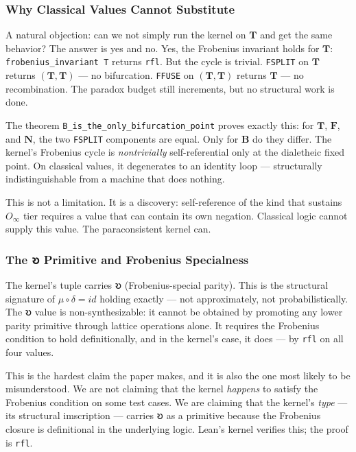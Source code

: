 \documentclass[10pt,a4paper]{article}
\begin{document}
\subsubsection{Why Classical Values Cannot Substitute}

A natural objection: can we not simply run the kernel on $\mathbf{T}$ and get the same behavior? The answer is yes and no. Yes, the Frobenius invariant holds for $\mathbf{T}$: \texttt{frobenius\_\allowbreak invariant T} returns \texttt{rfl}. But the cycle is trivial. \texttt{FSPLIT}  on $\mathbf{T}$ returns $(\mathbf{T}, \mathbf{T})$ --- no bifurcation. \texttt{FFUSE} on $(\mathbf{T}, \mathbf{T})$ returns $\mathbf{T}$ --- no recombination. The paradox budget still increments, but no structural work is done.

The theorem \texttt{B\_\allowbreak is\_\allowbreak the\_\allowbreak only\_\allowbreak bifurcation\_\allowbreak point} proves exactly this: for $\mathbf{T}$, $\mathbf{F}$, and $\mathbf{N}$, the two \texttt{FSPLIT}  components are equal. Only for $\mathbf{B}$ do they differ. The kernel's Frobenius cycle is \emph{nontrivially} self-referential only at the dialetheic fixed point. On classical values, it degenerates to an identity loop --- structurally indistinguishable from a machine that does nothing.

This is not a limitation. It is a discovery: self-reference of the kind that sustains $O_{\infty}$ tier requires a value that can contain its own negation. Classical logic cannot supply this value. The paraconsistent kernel can.

\subsubsection{The 𐑹 Primitive and Frobenius Specialness}

The kernel's tuple carries 𐑹 (Frobenius-special parity). This is the structural signature of $\mu\circ\delta = id$ holding exactly --- not approximately, not probabilistically. The 𐑹 value is non-synthesizable: it cannot be obtained by promoting any lower parity primitive through lattice operations alone. It requires the Frobenius condition to hold definitionally, and in the kernel's case, it does --- by \texttt{rfl} on all four values.

This is the hardest claim the paper makes, and it is also the one most likely to be misunderstood. We are not claiming that the kernel \emph{happens} to satisfy the Frobenius condition on some test cases. We are claiming that the kernel's \emph{type} --- its structural imscription --- carries 𐑹 as a primitive because the Frobenius closure is definitional in the underlying logic. Lean's kernel verifies this; the proof is \texttt{rfl}.
\end{document}
